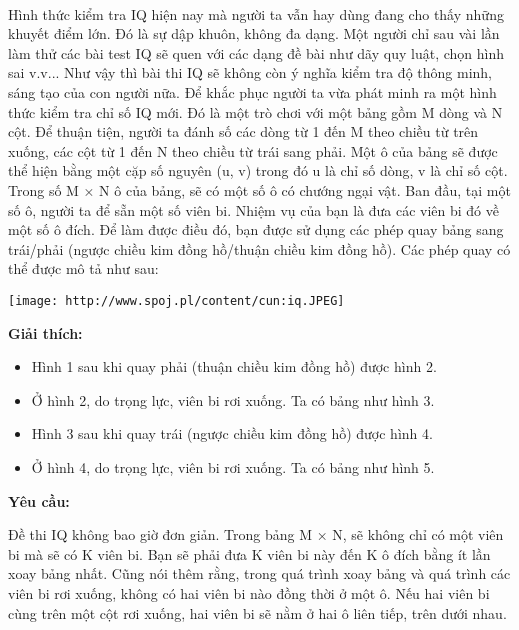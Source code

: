  

Hình thức kiểm tra IQ hiện nay mà người ta vẫn hay dùng đang cho thấy những khuyết điểm lớn. Đó là sự dập khuôn, không đa dạng. Một người chỉ sau vài lần làm thử các bài test IQ sẽ quen với các dạng đề bài như dãy quy luật, chọn hình sai v.v... Như vậy thì bài thi IQ sẽ không còn ý nghĩa kiểm tra độ thông minh, sáng tạo của con người nữa. Để khắc phục người ta vừa phát minh ra một hình thức kiểm tra chỉ số IQ mới. Đó là một trò chơi với một bảng gồm M dòng và N cột. Để thuận tiện, người ta đánh số các dòng từ 1 đến M theo chiều từ trên xuống, các cột từ 1 đến N theo chiều từ trái sang phải. Một ô của bảng sẽ được thể hiện bằng một cặp số nguyên (u, v) trong đó u là chỉ số dòng, v là chỉ số cột. Trong số M × N ô của bảng, sẽ có một số ô có chướng ngại vật. Ban đầu, tại một số ô, người ta để sẵn một số viên bi. Nhiệm vụ của bạn là đưa các viên bi đó về một số ô đích. Để làm được điều đó, bạn được sử dụng các phép quay bảng sang trái/phải (ngược chiều kim đồng hồ/thuận chiều kim đồng hồ). Các phép quay có thể được mô tả như sau:


\texttt{[image: http://www.spoj.pl/content/cun:iq.JPEG]}

\textbf{Giải thích:}
\begin{itemize}
	\item Hình 1 sau khi quay phải (thuận chiều kim đồng hồ) được hình 2.
	\item Ở hình 2, do trọng lực, viên bi rơi xuống. Ta có bảng như hình 3.
	\item Hình 3 sau khi quay trái (ngược chiều kim đồng hồ) được hình 4.
	\item Ở hình 4, do trọng lực, viên bi rơi xuống. Ta có bảng như hình 5.
\end{itemize}

\textbf{Yêu cầu:}

Đề thi IQ không bao giờ đơn giản. Trong bảng M × N, sẽ không chỉ có một viên bi mà sẽ có K viên bi. Bạn sẽ phải đưa K viên bi này đến K ô đích bằng ít lần xoay bảng nhất. Cũng nói thêm rằng, trong quá trình xoay bảng và quá trình các viên bi rơi xuống, không có hai viên bi nào đồng thời ở một ô. Nếu hai viên bi cùng trên một cột rơi xuống, hai viên bi sẽ nằm ở hai ô liên tiếp, trên dưới nhau.

\